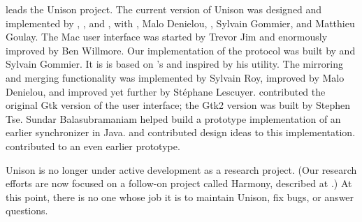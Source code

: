 \documentclass{article}
\begin{document}


 leads the
Unison project.   
%
The current version of Unison was designed and implemented by
    ,
    ,
and
    ,
with
    ,
    {Malo Denielou},
    ,
    Sylvain Gommier, and
    Matthieu Goulay.
%
The Mac user interface was started by Trevor Jim and enormously improved by
Ben Willmore. 
%
Our implementation of the
  protocol was built by
  and Sylvain Gommier.  It is is based on
  's
  and inspired by his
  utility.
%
The mirroring and merging functionality was implemented by
  Sylvain Roy, improved by Malo Denielou, and improved yet further by
  St\'ephane Lescuyer.
%
 contributed the original Gtk version of the user
  interface; the Gtk2 version was built by Stephen Tse. 
%
Sundar Balasubramaniam helped build a prototype implementation of
an earlier synchronizer in Java.
and
 contributed design
ideas to this implementation.
contributed to an even earlier prototype.





Unison is no longer under active development as a research
project.  (Our research efforts  are now focused on a follow-on
project called Harmony, described at
.) 
At this point, there is no one whose job it is to maintain Unison,
fix bugs, or answer questions.
\end{document}
